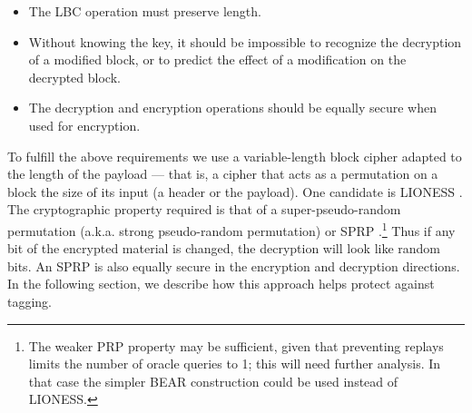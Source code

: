 \documentclass[times,10pt,twocolumn]{article}
\begin{document}
\begin{itemize}
\item The LBC operation must preserve length.
\item Without knowing the key, it should be impossible to recognize the
   decryption of a modified block, or to predict the effect of a modification
   on the decrypted block.
\item The decryption and encryption operations should be equally secure when
  used for encryption.
\end{itemize}

To fulfill the above requirements we use a variable-length block
cipher adapted to the length of the payload --- that
is, a cipher that acts as a permutation on a block the size of its
input (a header or the payload).  One candidate
is LIONESS \cite{BEAR-LIONESS}.
The cryptographic property required is that of a super-pseudo-random
permutation (a.k.a. strong pseudo-random permutation) or SPRP \cite{sprp}.\footnote{
The weaker PRP property may be sufficient, given that preventing
replays limits the number of oracle queries to 1; this will need
further analysis.  In that case the simpler BEAR construction
\cite{BEAR-LIONESS} could be used instead of LIONESS.}
Thus if any bit of
the encrypted material is changed, the decryption will look like random
bits.  An SPRP is also equally secure in the encryption and decryption
directions.  In the following section, we describe
how this approach helps protect against tagging.


%
\end{document}
